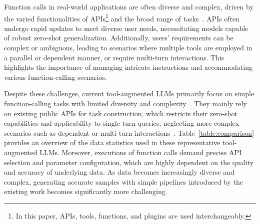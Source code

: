 \documentclass{article}
\begin{document}
Function calls in real-world applications are often diverse and complex, driven by the varied functionalities of APIs\footnote{In this paper, APIs, tools, functions, and plugins are used interchangeably.} and the broad range of tasks~\cite{qin2023toolllm}. APIs often undergo rapid updates to meet diverse user needs, necessitating models capable of robust zero-shot generalization. Additionally, users' requirements can be complex or ambiguous, leading to scenarios where multiple tools are employed in a parallel or dependent manner, or require multi-turn interactions. This highlights the importance of managing intricate instructions and accommodating various function-calling scenarios.


Despite these challenges, current tool-augmented LLMs primarily focus on simple function-calling tasks with limited diversity and complexity~\cite{qu2024tool}. They mainly rely on existing public APIs for task construction, which restricts their zero-shot capabilities and applicability to single-turn queries, neglecting more complex scenarios such as dependent or multi-turn interactions~\cite{qin2023toolllm,tang2023toolalpaca,liu2024apigen}. Table~\ref{table:comparison} provides an overview of the data statistics used in these representative tool-augmented LLMs. Moreover, executions of function calls demand precise API selection and parameter configuration, which are highly dependent on the quality and accuracy of underlying data. 
As data becomes increasingly diverse and complex, generating accurate samples with simple pipelines introduced by the existing work becomes significantly more challenging.



\end{document}
